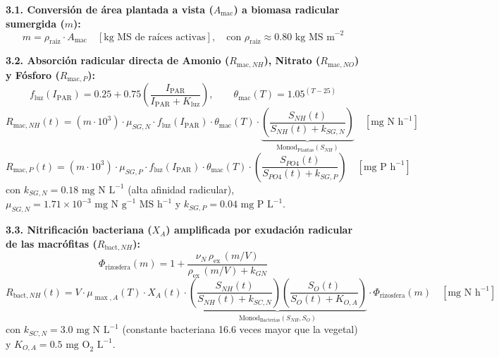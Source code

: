 \documentclass[11pt,letterpaper]{article}
\begin{document}
\begin{formulabox}
\textbf{3.1. Conversión de área plantada a vista ($A_{\text{mac}}$) a biomasa radicular sumergida ($m$):}
\begin{equation}
m = \rho_{\text{raiz}} \cdot A_{\text{mac}} \quad [\text{kg MS de raíces activas}], \quad \text{con } \rho_{\text{raiz}} \approx 0.80\text{ kg MS m}^{-2}
\label{eq:mmac}
\end{equation}

\textbf{3.2. Absorción radicular directa de Amonio ($R_{\text{mac},NH}$), Nitrato ($R_{\text{mac},NO}$) y Fósforo ($R_{\text{mac},P}$):}
\begin{equation}
f_{\text{luz}}(I_{\text{PAR}}) = 0.25 + 0.75\left(\frac{I_{\text{PAR}}}{I_{\text{PAR}} + K_{\text{luz}}}\right), \qquad \theta_{\text{mac}}(T) = 1.05^{(T - 25)}
\label{eq:fluz}
\end{equation}
\begin{equation}
R_{\text{mac},NH}(t) = \left(m \cdot 10^3\right) \cdot \mu_{SG,N} \cdot f_{\text{luz}}(I_{\text{PAR}}) \cdot \theta_{\text{mac}}(T) \cdot \underbrace{\left(\frac{S_{NH}(t)}{S_{NH}(t) + k_{SG,N}}\right)}_{\text{Monod}_{\text{Plantas}}(S_{NH})} \quad [\text{mg N h}^{-1}]
\label{eq:rmacnh}
\end{equation}
\begin{equation}
R_{\text{mac},P}(t) = \left(m \cdot 10^3\right) \cdot \mu_{SG,P} \cdot f_{\text{luz}}(I_{\text{PAR}}) \cdot \theta_{\text{mac}}(T) \cdot \left(\frac{S_{PO4}(t)}{S_{PO4}(t) + k_{SG,P}}\right) \quad [\text{mg P h}^{-1}]
\label{eq:rmacp}
\end{equation}
con $k_{SG,N} = 0.18\text{ mg N L}^{-1}$ (alta afinidad radicular), $\mu_{SG,N} = 1.71\times 10^{-3}\text{ mg N g}^{-1}\text{ MS h}^{-1}$ y $k_{SG,P} = 0.04\text{ mg P L}^{-1}$.

\textbf{3.3. Nitrificación bacteriana ($X_A$) amplificada por exudación radicular de las macrófitas ($R_{\text{bact},NH}$):}
\begin{equation}
\Phi_{\text{rizosfera}}(m) = 1 + \frac{\nu_N \, \rho_{\text{ex}} \, (m / V)}{\rho_{\text{ex}} \, (m / V) + k_{GN}}
\label{eq:phiriz}
\end{equation}
\begin{equation}
R_{\text{bact},NH}(t) = V \cdot \mu_{\max,A}(T) \cdot X_A(t) \cdot \underbrace{\left(\frac{S_{NH}(t)}{S_{NH}(t) + k_{SC,N}}\right)\left(\frac{S_O(t)}{S_O(t) + K_{O,A}}\right)}_{\text{Monod}_{\text{Bacterias}}(S_{NH}, S_O)} \cdot \Phi_{\text{rizosfera}}(m) \quad [\text{mg N h}^{-1}]
\label{eq:rbactnh}
\end{equation}
con $k_{SC,N} = 3.0\text{ mg N L}^{-1}$ (constante bacteriana 16.6 veces mayor que la vegetal) y $K_{O,A} = 0.5\text{ mg O}_2\text{ L}^{-1}$.
\end{formulabox}
\end{document}
